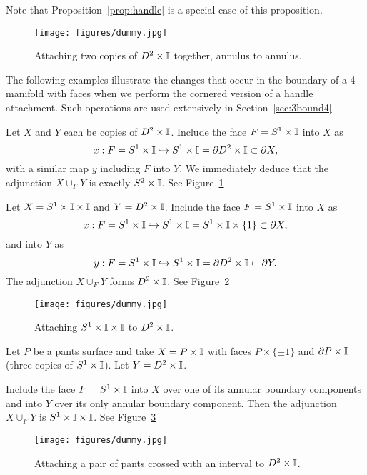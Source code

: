 Note that Proposition~\ref{prop:handle} is a special case of this proposition.

\begin{figure}[H]
	\centering
	\caption{Attaching two copies of $D^2\times\mathbb{I}$ together, annulus to annulus.}
	\texttt{[image: figures/dummy.jpg]}
	\label{fig:DxIuDxI}
\end{figure}

The following examples illustrate the changes that occur in the boundary of a 4--manifold with faces when we perform the cornered version of a handle attachment.
Such operations are used extensively in Section~\ref{sec:3bound4}.

\begin{ex}
	\label{ex:DxIuDxI}
	Let $X$ and $Y$ each be copies of $D^2\times\mathbb{I}$.
	Include the face $F=S^1\times\mathbb{I}$ into $X$ as
	\[
	x:F= S^1\times\mathbb{I}\hookrightarrow S^1\times\mathbb{I}=\partial D^2 \times\mathbb{I}\subset \partial X,
	\]
	with a similar map $y$ including $F$ into $Y$.
	We immediately deduce that the adjunction $X\cup_F Y$ is exactly $S^2\times\mathbb{I}$.
	See Figure~\ref{fig:DxIuDxI}
\end{ex}

\begin{ex}
	\label{ex:AxIuDxI}
	Let $X=S^1\times\mathbb{I}\times\mathbb{I}$ and $Y=D^2\times\mathbb{I}$.
	Include the face $F=S^1\times\mathbb{I}$ into $X$ as
	\[
		x:F= S^1\times\mathbb{I} \hookrightarrow S^1\times\mathbb{I}=S^1 \times\mathbb{I}\times\{1\}\subset \partial X,
	\]
	and into $Y$ as
	\[
		y:F= S^1\times\mathbb{I}\hookrightarrow S^1\times\mathbb{I}=\partial D^2 \times\mathbb{I}\subset \partial Y.
	\]
	The adjunction $X\cup_F Y$ forms $D^2\times\mathbb{I}$.
	See Figure~\ref{fig:AxIuDxI}
\end{ex}

\begin{figure}[H]
	\centering
	\caption{Attaching $S^1\times\mathbb{I}\times\mathbb{I}$ to $D^2\times\mathbb{I}$.}
	\texttt{[image: figures/dummy.jpg]}
	\label{fig:AxIuDxI}
\end{figure}

\begin{ex}
	\label{ex:PxIuDxI}
	Let $P$ be a pants surface and take $X=P\times\mathbb{I}$ with faces $P\times\{\pm 1\}$ and $\partial P\times\mathbb{I}$ (three copies of $S^1\times \mathbb{I}$).
	Let $Y=D^2\times\mathbb{I}$.
	
	Include the face $F=S^1\times\mathbb{I}$ into $X$ over one of its annular boundary components and into $Y$ over its only annular boundary component.
	Then the adjunction $X\cup_F Y$ is $ S^1\times\mathbb{I}\times\mathbb{I} $.
	See Figure~\ref{fig:PxIuDxI}
\end{ex}

\begin{figure}[H]
	\centering
	\caption{Attaching a pair of pants crossed with an interval to $D^2\times\mathbb{I}$.}
	\texttt{[image: figures/dummy.jpg]}
	\label{fig:PxIuDxI}
\end{figure}

